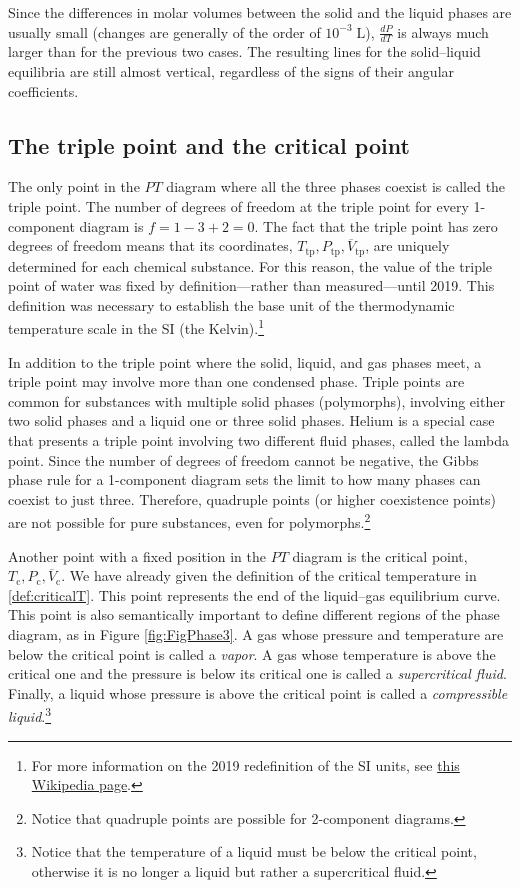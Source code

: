 \documentclass[
  9pt,
]{extbook}
\theoremstyle{definition}
\theoremstyle{definition}
\theoremstyle{definition}
\theoremstyle{remark}
\begin{document}
Since the differences in molar volumes between the solid and the liquid phases are usually small (changes are generally of the order of \(10^{-3}\;\mathrm{L}\)), \(\frac{dP}{dT}\) is always much larger than for the previous two cases. The resulting lines for the solid--liquid equilibria are still almost vertical, regardless of the signs of their angular coefficients.

\hypertarget{the-triple-point-and-the-critical-point}{%
\subsection{The triple point and the critical point}\label{the-triple-point-and-the-critical-point}}

The only point in the \(PT\) diagram where all the three phases coexist is called the triple point. The number of degrees of freedom at the triple point for every 1-component diagram is \(f=1-3+2=0\). The fact that the triple point has zero degrees of freedom means that its coordinates, \({T_{\text{tp}},P_{\text{tp}},\overline{V}_{\text{tp}}}\), are uniquely determined for each chemical substance. For this reason, the value of the triple point of water was fixed by definition---rather than measured---until 2019. This definition was necessary to establish the base unit of the thermodynamic temperature scale in the SI (the Kelvin).\footnote{For more information on the 2019 redefinition of the SI units, see \href{https://en.wikipedia.org/wiki/2019_redefinition_of_the_SI_base_units}{this Wikipedia page}.}

In addition to the triple point where the solid, liquid, and gas phases meet, a triple point may involve more than one condensed phase. Triple points are common for substances with multiple solid phases (polymorphs), involving either two solid phases and a liquid one or three solid phases. Helium is a special case that presents a triple point involving two different fluid phases, called the lambda point. Since the number of degrees of freedom cannot be negative, the Gibbs phase rule for a 1-component diagram sets the limit to how many phases can coexist to just three. Therefore, quadruple points (or higher coexistence points) are not possible for pure substances, even for polymorphs.\footnote{Notice that quadruple points are possible for 2-component diagrams.}

Another point with a fixed position in the \(PT\) diagram is the critical point, \({T_{\text{c}},P_{\text{c}},\overline{V}_{\text{c}}}\). We have already given the definition of the critical temperature in \ref{def:criticalT}. This point represents the end of the liquid--gas equilibrium curve. This point is also semantically important to define different regions of the phase diagram, as in Figure \ref{fig:FigPhase3}. A gas whose pressure and temperature are below the critical point is called a \emph{vapor}. A gas whose temperature is above the critical one and the pressure is below its critical one is called a \emph{supercritical fluid}. Finally, a liquid whose pressure is above the critical point is called a \emph{compressible liquid}.\footnote{Notice that the temperature of a liquid must be below the critical point, otherwise it is no longer a liquid but rather a supercritical fluid.}
\end{document}
